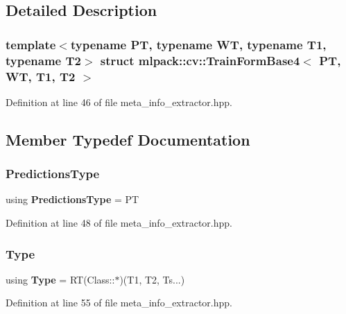 \subsection{Detailed Description}
\subsubsection*{template$<$typename PT, typename WT, typename T1, typename T2$>$\newline
struct mlpack\+::cv\+::\+Train\+Form\+Base4$<$ P\+T, W\+T, T1, T2 $>$}



Definition at line 46 of file meta\+\_\+info\+\_\+extractor.\+hpp.



\subsection{Member Typedef Documentation}
\mbox{\label{structmlpack_1_1cv_1_1TrainFormBase4_a329a0bee5f08ebbfbd6c97e4f74bdb4f}} 
\subsubsection{Predictions\+Type}
{\footnotesize\ttfamily using \textbf{ Predictions\+Type} =  PT}



Definition at line 48 of file meta\+\_\+info\+\_\+extractor.\+hpp.

\mbox{\label{structmlpack_1_1cv_1_1TrainFormBase4_a61f44880a9510b9d414669ea7e7263f1}} 
\subsubsection{Type}
{\footnotesize\ttfamily using \textbf{ Type} =  RT(Class\+::$\ast$)(T1, T2, Ts...)}



Definition at line 55 of file meta\+\_\+info\+\_\+extractor.\+hpp.

\mbox{\label{structmlpack_1_1cv_1_1TrainFormBase4_aecfc3bfd62796ddd9feb857c898cefa8}} 
